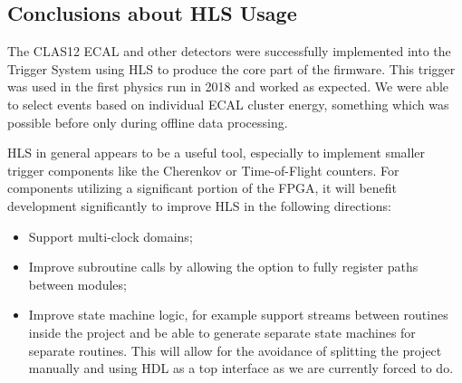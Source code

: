 \subsection{Conclusions about HLS Usage}

The CLAS12 ECAL and other detectors were successfully implemented into the Trigger System using HLS to
produce the core part of the firmware. This trigger was used in the first physics run in 2018 and worked as
expected. We were able to select events based on individual ECAL cluster energy, something which was possible
before only during offline data processing.

HLS in general appears to be a useful tool, especially to implement smaller trigger components like the
Cherenkov or Time-of-Flight counters. For components utilizing a significant portion of the FPGA, it will
benefit development significantly to improve HLS in the following directions:

\begin{itemize}
	\item Support multi-clock domains;
	\item Improve subroutine calls by allowing the option to fully register paths between modules; 
	\item Improve state machine logic, for example support streams between routines inside the project
          and be able to generate separate state machines for separate routines. This will allow for the avoidance
          of splitting the project manually and using HDL as a top interface as we are currently forced to do.
\end{itemize}
